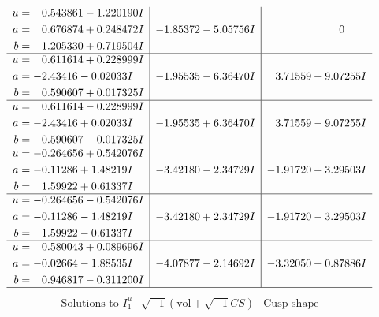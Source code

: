 \documentclass[1p]{elsarticle_modified}
\theoremstyle{definition}
\newcommand{\I}{\sqrt{-1}}
\begin{document}
$$\begin{array}{c|c|c}
\begin{aligned}
u &= \phantom{-}0.543861 - 1.220190 I \\
a &= \phantom{-}0.676874 + 0.248472 I \\
b &= \phantom{-}1.205330 + 0.719504 I\end{aligned}
 & -1.85372 - 5.05756 I & \phantom{-0.000000 } 0 \\ \hline\begin{aligned}
u &= \phantom{-}0.611614 + 0.228999 I \\
a &= -2.43416 - 0.02033 I \\
b &= \phantom{-}0.590607 + 0.017325 I\end{aligned}
 & -1.95535 - 6.36470 I & \phantom{-}3.71559 + 9.07255 I \\ \hline\begin{aligned}
u &= \phantom{-}0.611614 - 0.228999 I \\
a &= -2.43416 + 0.02033 I \\
b &= \phantom{-}0.590607 - 0.017325 I\end{aligned}
 & -1.95535 + 6.36470 I & \phantom{-}3.71559 - 9.07255 I \\ \hline\begin{aligned}
u &= -0.264656 + 0.542076 I \\
a &= -0.11286 + 1.48219 I \\
b &= \phantom{-}1.59922 + 0.61337 I\end{aligned}
 & -3.42180 - 2.34729 I & -1.91720 + 3.29503 I \\ \hline\begin{aligned}
u &= -0.264656 - 0.542076 I \\
a &= -0.11286 - 1.48219 I \\
b &= \phantom{-}1.59922 - 0.61337 I\end{aligned}
 & -3.42180 + 2.34729 I & -1.91720 - 3.29503 I \\ \hline\begin{aligned}
u &= \phantom{-}0.580043 + 0.089696 I \\
a &= -0.02664 - 1.88535 I \\
b &= \phantom{-}0.946817 - 0.311200 I\end{aligned}
 & -4.07877 - 2.14692 I & -3.32050 + 0.87886 I\\
 \hline 
 \end{array}$$\newpage$$\begin{array}{c|c|c}  
\text{Solutions to }I^u_{1}& \I (\text{vol} + \sqrt{-1}CS) & \text{Cusp shape}\\
 \hline 
\begin{aligned}

\end{aligned}
\end{array}$$
\end{document}
